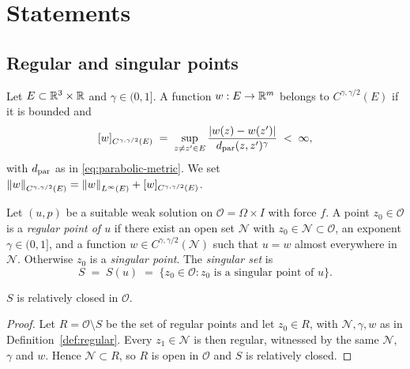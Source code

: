 \documentclass[11pt,reqno]{amsart}
\begin{document}
\section{Statements}\label{sec:theorems}

\subsection{Regular and singular points}\label{ss:regular}

\begin{definition}\label{def:holder}
Let $E\subset\mathbb{R}^{3}\times\mathbb{R}$ and $\gamma\in(0,1]$. A function
$w:E\to\mathbb{R}^{m}$ belongs to $C^{\gamma,\gamma/2}(E)$ if it is bounded and
\[
  [w]_{C^{\gamma,\gamma/2}(E)}
  \;=\;\sup_{z\neq z'\in E}\frac{\left\lvert w(z)-w(z') \right\rvert}{d_{\mathrm{par}}(z,z')^{\gamma}}
  \;<\;\infty ,
\]
with $d_{\mathrm{par}}$ as in \eqref{eq:parabolic-metric}. We set
$\left\lVert w \right\rVert_{C^{\gamma,\gamma/2}(E)}
 =\left\lVert w \right\rVert_{L^{\infty}(E)}+[w]_{C^{\gamma,\gamma/2}(E)}$.
\end{definition}

\begin{definition}\label{def:regular}
Let $(u,p)$ be a suitable weak solution on $\mathcal{O}=\Omega\times I$ with
force $f$. A point $z_{0}\in\mathcal{O}$ is a \emph{regular point of $u$} if
there exist an open set $\mathcal{N}$ with $z_{0}\in\mathcal{N}\subset\mathcal{O}$,
an exponent $\gamma\in(0,1]$, and a function $w\in C^{\gamma,\gamma/2}(\mathcal{N})$
such that $u=w$ almost everywhere in $\mathcal{N}$. Otherwise $z_{0}$ is a
\emph{singular point}. The \emph{singular set} is
\[
  S \;=\; S(u)\;=\;\{z_{0}\in\mathcal{O}: z_{0}\text{ is a singular point of }u\} .
\]
\end{definition}

\begin{lemma}\label{lem:S-closed}
$S$ is relatively closed in $\mathcal{O}$.
\end{lemma}

\begin{proof}
Let $R=\mathcal{O}\setminus S$ be the set of regular points and let
$z_{0}\in R$, with $\mathcal{N},\gamma,w$ as in Definition~\ref{def:regular}.
Every $z_{1}\in\mathcal{N}$ is then regular, witnessed by the same
$\mathcal{N}$, $\gamma$ and $w$. Hence $\mathcal{N}\subset R$, so $R$ is open in
$\mathcal{O}$ and $S$ is relatively closed.
\end{proof}
\end{document}
